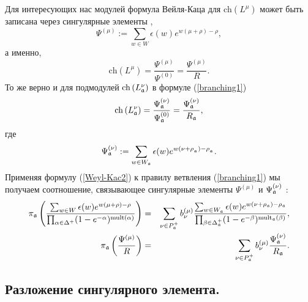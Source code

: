 \documentclass[12pt]{article}
\theoremstyle{definition}
\begin{document}
Для интересующих нас модулей формула Вейля-Каца для  $\mathrm{ch}\left( L^{\mu }\right) $ может быть записана через сингулярные элементы \cite{humphreys1997introduction},
\begin{equation*}
\Psi ^{\left( \mu \right) }:=\sum\limits_{w\in W}\epsilon (w)e^{w(\mu +\rho
)-\rho },
\end{equation*}
а именно,
\begin{equation}
\mathrm{ch}\left( L^{\mu }\right) =\frac{\Psi ^{\left( \mu \right) }}{\Psi
^{\left( 0\right) }}=\frac{\Psi ^{\left( \mu \right) }}{R}.
\label{Weyl-Kac2}
\end{equation}
То же верно и для подмодулей $\mathrm{ch}\left( L_{\frak{a}}^{\nu
}\right) $ в формуле (\ref{branching1})
\begin{equation*}
\mathrm{ch}\left( L_{\frak{a}}^{\nu }\right) =\frac{\Psi _{\frak{a}}^{\left(
\nu \right) }}{\Psi _{\frak{a}}^{\left( 0\right) }}=\frac{\Psi _{\frak{a}%
}^{\left( \nu \right) }}{R_{\frak{a}}},
\end{equation*}
где
\begin{equation*}
\Psi _{\frak{a}}^{\left( \nu \right) }:=\sum\limits_{w\in W_{\frak{a}%
}}\epsilon (w)e^{w(\nu +\rho _{_{\frak{a}}})-\rho _{_{\frak{a}}}}.
\end{equation*}
Применяя формулу  (\ref{Weyl-Kac2}) к правилу ветвления  (\ref{branching1}) мы получаем соотношение, связывающее сингулярные элементы $\Psi ^{\left( \mu
\right) }$ и $\Psi _{\frak{a}}^{\left( \nu \right) }$ :
\begin{eqnarray}
\pi _{\frak{a}}\left( \frac{\sum_{w \in W}\epsilon (w )e^{w (\mu +\rho
)-\rho }}{\prod_{\alpha \in \Delta ^{+}}(1-e^{-\alpha })^{\mathrm{mult}%
(\alpha )}}\right) &=&\sum_{\nu \in P_{\frak{a}}^{+}}b_{\nu }^{(\mu )}\frac{%
\sum_{w \in W_{\frak{a}}}\epsilon (w )e^{w (\nu +\rho _{\frak{a}})-\rho _{%
\frak{a}}}}{\prod_{\beta \in \Delta _{\frak{a}}^{+}}(1-e^{-\beta })^{\mathrm{%
mult}_{\frak{a}}(\beta )}},  \notag  \label{eq:4} \\
\pi _{\frak{a}}\left( \frac{\Psi ^{\left( \mu \right) }}{R}\right)
&=&\sum_{\nu \in P_{\frak{a}}^{+}}b_{\nu }^{(\mu )}\frac{\Psi _{\frak{a}%
}^{\left( \nu \right) }}{R_{\frak{a}}}.
\end{eqnarray}

\subsection{Разложение сингулярного элемента.}

\label{subsec:decomp-sing-element}
\end{document}
